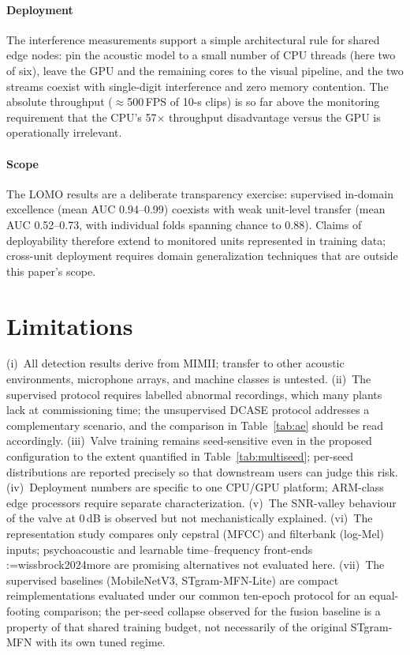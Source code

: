 \documentclass[review,nopreprintline]{elsarticle}
\makeatletter
\newif\ifmc@notfirst
\let\@oldcite\cite
\def\mc@splitcite#1{%
    \begingroup
    \mc@notfirstfalse
    \@for\@citekey:=#1\do{%
      \ifmc@notfirst, \fi
      \mc@notfirsttrue
      \@oldcite{\@citekey}%
    }%
    \endgroup
  }%
\def\cite#1{\protect\mc@splitcite{#1}}%
\makeatother
\begin{document}
\paragraph{Deployment} The interference measurements support a simple architectural rule for shared edge nodes: pin the acoustic model to a small number of CPU threads (here two of six), leave the GPU and the remaining cores to the visual pipeline, and the two streams coexist with single-digit interference and zero memory contention. The absolute throughput ($\approx$500\,FPS of 10-s clips) is so far above the monitoring requirement that the CPU's 57$\times$ throughput disadvantage versus the GPU is operationally irrelevant.

\paragraph{Scope} The LOMO results are a deliberate transparency exercise: supervised in-domain excellence (mean AUC 0.94--0.99) coexists with weak unit-level transfer (mean AUC 0.52--0.73, with individual folds spanning chance to 0.88). Claims of deployability therefore extend to monitored units represented in training data; cross-unit deployment requires domain generalization techniques that are outside this paper's scope.

\section{Limitations}
\label{sec:limitations}

(i)~All detection results derive from MIMII; transfer to other acoustic environments, microphone arrays, and machine classes is untested. (ii)~The supervised protocol requires labelled abnormal recordings, which many plants lack at commissioning time; the unsupervised DCASE protocol addresses a complementary scenario, and the comparison in Table~\ref{tab:ae} should be read accordingly. (iii)~Valve training remains seed-sensitive even in the proposed configuration to the extent quantified in Table~\ref{tab:multiseed}; per-seed distributions are reported precisely so that downstream users can judge this risk. (iv)~Deployment numbers are specific to one CPU/GPU platform; ARM-class edge processors require separate characterization. (v)~The SNR-valley behaviour of the valve at 0\,dB is observed but not mechanistically explained. (vi)~The representation study compares only cepstral (MFCC) and filterbank (log-Mel) inputs; psychoacoustic and learnable time--frequency front-ends~\cite{wissbrock2024more} are promising alternatives not evaluated here. (vii)~The supervised baselines (MobileNetV3, STgram-MFN-Lite) are compact reimplementations evaluated under our common ten-epoch protocol for an equal-footing comparison; the per-seed collapse observed for the fusion baseline is a property of that shared training budget, not necessarily of the original STgram-MFN with its own tuned regime.
\end{document}
